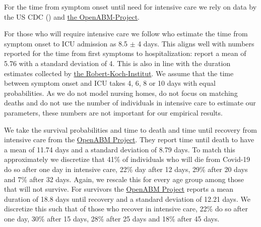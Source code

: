 For the time from symptom onset until need for intensive care we rely on data by the US
CDC (\citet{Stokes2020}) and \href{https://bit.ly/3yKXFyu}{the OpenABM-Project}.
%
%
%
%

For those who will require intensive care we follow \citet{Chen2020} who estimate the
time from symptom onset to ICU admission as 8.5 $\pm$ 4 days. This aligns well with
numbers reported for the time from first symptoms to hospitalization:
\citet{Gaythorpe2020} report a mean of 5.76 with a standard deviation of 4. This is also
in line with the duration estimates collected by \href{https://bit.ly/3gkGtaU}{the
Robert-Koch-Institut}. We assume that the time between symptom onset and ICU takes 4, 6,
8 or 10 days with equal probabilities. As we do not model nursing homes, do not focus on
matching deaths and do not use the number of individuals in intensive care to estimate
our parameters, these numbers are not important for our empirical results.



We take the survival probabilities and time to death and time until recovery from
intensive care from the \href{https://tinyurl.com/y5owhyts}{OpenABM Project}. They report
time until death to have a mean of 11.74 days and a standard deviation of 8.79 days. To
match this approximately we discretize that 41\% of individuals who will die from
Covid-19 do so after one day in intensive care, 22\% day after 12 days, 29\% after 20
days and 7\% after 32 days. Again, we rescale this for every age group among those that
will not survive. For survivors the \href{https://tinyurl.com/y5owhyts}{OpenABM Project}
reports a mean duration of 18.8 days until recovery and a standard deviation of 12.21
days. We discretize this such that of those who recover in intensive care, 22\% do so
after one day, 30\% after 15 days, 28\% after 25 days and 18\% after 45 days.
